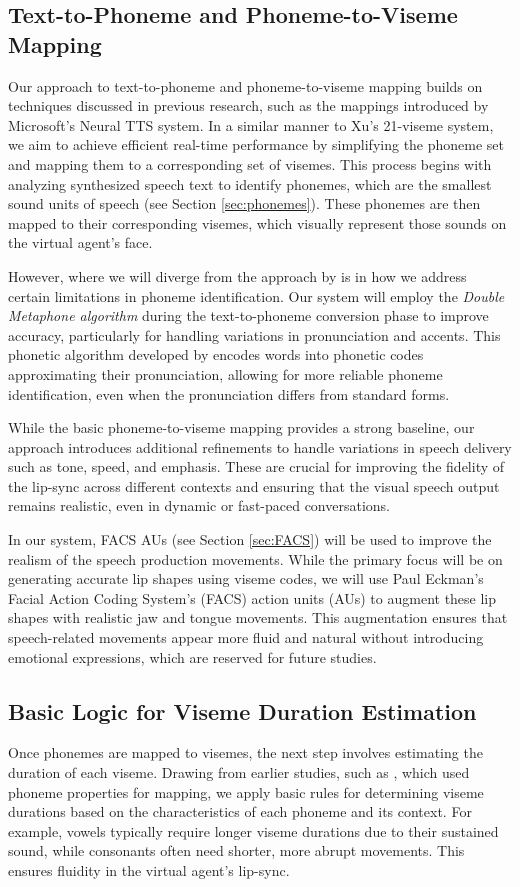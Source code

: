 \documentclass[12pt]{article}
\begin{document}
\subsection{Text-to-Phoneme and Phoneme-to-Viseme Mapping}
Our approach to text-to-phoneme and phoneme-to-viseme mapping builds on techniques discussed in previous research, such as the mappings introduced by \cite{Xu213}  Microsoft’s Neural TTS system. In a similar manner to Xu’s 21-viseme system, we aim to achieve efficient real-time performance by simplifying the phoneme set and mapping them to a corresponding set of visemes. This process begins with analyzing synthesized speech text to identify phonemes, which are the smallest sound units of speech (see Section \ref{sec:phonemes}). These phonemes are then mapped to their corresponding visemes, which visually represent those sounds on the virtual agent's face.

However, where we will diverge from the approach by \cite{Xu213} is in how we address certain limitations in phoneme identification. Our system will employ the \textit{Double Metaphone algorithm} during the text-to-phoneme conversion phase to improve accuracy, particularly for handling variations in pronunciation and accents. This phonetic algorithm developed by \cite{philips2000double} encodes words into phonetic codes approximating their pronunciation, allowing for more reliable phoneme identification, even when the pronunciation differs from standard forms.

While the basic phoneme-to-viseme mapping provides a strong baseline, our approach introduces additional refinements to handle variations in speech delivery such as tone, speed, and emphasis. These are crucial for improving the fidelity of the lip-sync across different contexts and ensuring that the visual speech output remains realistic, even in dynamic or fast-paced conversations.

In our system, FACS AUs (see Section \ref{sec:FACS}) will be used to improve the realism of the speech production movements. While the primary focus will be on generating accurate lip shapes using viseme codes, we will use Paul Eckman's Facial Action Coding System's (FACS) action units (AUs)\cite{ekman1978facs} to augment these lip shapes with realistic jaw and tongue movements. This augmentation ensures that speech-related movements appear more fluid and natural without introducing emotional expressions, which are reserved for future studies.

\subsection{Basic Logic for Viseme Duration Estimation}
Once phonemes are mapped to visemes, the next step involves estimating the duration of each viseme. Drawing from earlier studies, such as \cite{cappelletta2012}, which used phoneme properties for mapping, we apply basic rules for determining viseme durations based on the characteristics of each phoneme and its context. For example, vowels typically require longer viseme durations due to their sustained sound, while consonants often need shorter, more abrupt movements. This ensures fluidity in the virtual agent’s lip-sync.
\end{document}
